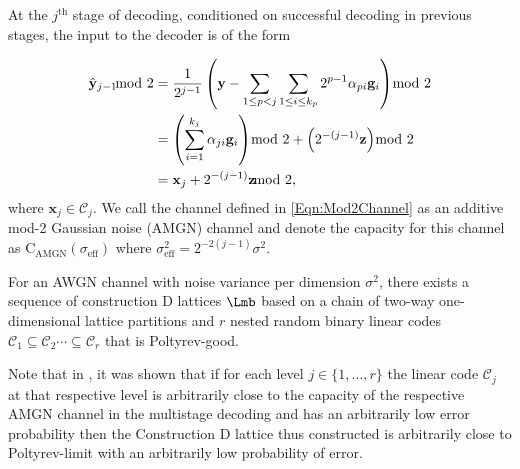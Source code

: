 \documentclass[journal]{IEEEtran}
\begin{document}
At the $j^{\text{th}}$ stage of decoding, conditioned on successful decoding in previous stages, the input to the decoder is of the
form

\begin{align}
\hat{\mathbf{y}}_{j-1} \hspace{-8pt}\mod 2%
&=\frac{1}{2^{j-1}}\left( \mathbf{y}-\sum_{1\leq p< j}\sum_{1\leq i\leq k_{p}}2^{p-1}\alpha_{pi}\mathbf{g}_i \right) \hspace{-8pt}\mod 2\notag\\
&=\left(\sum_{i=1}^{k_{j}}\alpha_{ji}\mathbf{g}_i \right) \hspace{-8pt}\mod 2 + \left( 2^{-(j-1)}\mathbf{z} \right) \hspace{-8pt}\mod 2\notag\\
&=\mathbf{x}_{j}+2^{-(j-1)}\mathbf{z} \hspace{-8pt}\mod 2,
\label{Eqn:Mod2Channel}
\end{align}
where $\mathbf{x}_{j}\in\mathcal{C}_{j}$. We call the channel defined in \eqref{Eqn:Mod2Channel} as an additive mod-2 Gaussian noise (AMGN) channel \cite{forney2000} and denote the capacity for this channel as  $\text{C}_{\text{AMGN}}(\sigma_{\text{eff}})$ where $\sigma_{\text{eff}}^{2}=2^{-2(j-1)}\sigma^{2}$.

\begin{theorem}
For an AWGN channel with noise variance per dimension $\sigma^{2}$, there exists a sequence of construction D lattices $\Lmb$ based on a chain of two-way one-dimensional lattice partitions and $r$ nested random binary linear codes $\mathcal{C}_{1}\subseteq \mathcal{C}_{2}\cdots \subseteq \mathcal{C}_{r}$ that is Poltyrev-good.
\end{theorem}

\begin{Remark}\label{Rmk:Forney_proof}
    Note that in \cite{forney2000}, it was shown that if for each level $j\in\{1,\ldots,r\}$ the linear code $\mathcal{C}_{j}$ at that respective level is arbitrarily close to the capacity of the respective AMGN channel in the multistage decoding and has an arbitrarily low error probability then the Construction D lattice thus constructed is arbitrarily close to Poltyrev-limit with an arbitrarily low probability of error.
\end{Remark}
\end{document}
